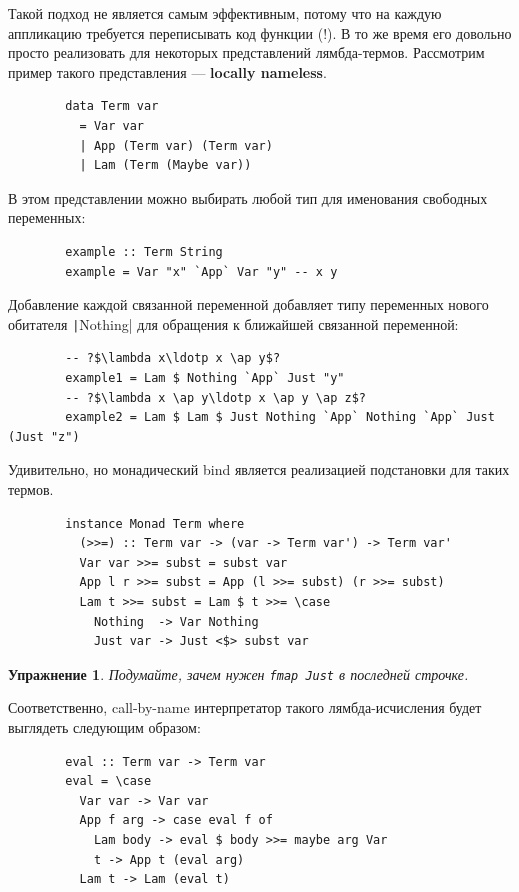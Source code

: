 \documentclass[12pt]{article}
\newcommand{\vocab}[1]{\textbf{#1}} %
\newcommand{\ap}{~}
\newtheorem{task}{Упражнение}
\begin{document}
    Такой подход не является самым эффективным, потому что на каждую аппликацию требуется переписывать код функции (!).
    В то же время его довольно просто реализовать для некоторых представлений лямбда-термов.
    Рассмотрим пример такого представления --- \vocab{locally nameless}.

    \begin{verbatim}
        data Term var
          = Var var
          | App (Term var) (Term var)
          | Lam (Term (Maybe var))
    \end{verbatim}

    В этом представлении можно выбирать любой тип для именования свободных переменных:
    \begin{verbatim}
        example :: Term String
        example = Var "x" `App` Var "y" -- x y
    \end{verbatim}
    Добавление каждой связанной переменной добавляет типу переменных нового обитателя \texttt|Nothing| для обращения к ближайшей связанной переменной:
    \begin{verbatim}
        -- ?$\lambda x\ldotp x \ap y$?
        example1 = Lam $ Nothing `App` Just "y"
        -- ?$\lambda x \ap y\ldotp x \ap y \ap z$?
        example2 = Lam $ Lam $ Just Nothing `App` Nothing `App` Just (Just "z")
    \end{verbatim}

    Удивительно, но монадический bind является реализацией подстановки для таких термов.

    \begin{verbatim}
        instance Monad Term where
          (>>=) :: Term var -> (var -> Term var') -> Term var'
          Var var >>= subst = subst var
          App l r >>= subst = App (l >>= subst) (r >>= subst)
          Lam t >>= subst = Lam $ t >>= \case
            Nothing  -> Var Nothing
            Just var -> Just <$> subst var
    \end{verbatim}

    \begin{task}
        Подумайте, зачем нужен \texttt{fmap Just} в последней строчке.
    \end{task}

    Соответственно, call-by-name интерпретатор такого лямбда-исчисления будет выглядеть следующим образом:

    \begin{verbatim}
        eval :: Term var -> Term var
        eval = \case
          Var var -> Var var
          App f arg -> case eval f of
            Lam body -> eval $ body >>= maybe arg Var
            t -> App t (eval arg)
          Lam t -> Lam (eval t)
    \end{verbatim}
\end{document}
